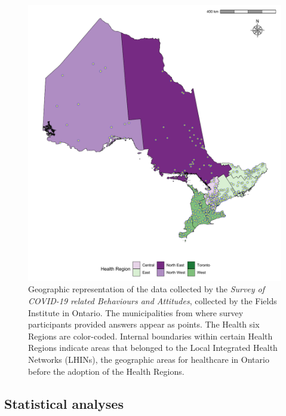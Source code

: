 \documentclass[
]{article}
\begin{document}
\begin{figure}

{\centering \includegraphics[width=\textwidth,height=1\textheight]{../data/map_data/map_cairo.pdf}

}

\caption{\label{fig-map}Geographic representation of the data collected
by the \emph{Survey of COVID-19 related Behaviours and Attitudes},
collected by the Fields Institute in Ontario. The municipalities from
where survey participants provided answers appear as points. The Health
six Regions are color-coded. Internal boundaries within certain Health
Regions indicate areas that belonged to the Local Integrated Health
Networks (LHINs), the geographic areas for healthcare in Ontario before
the adoption of the Health Regions.}

\end{figure}

\hypertarget{statistical-analyses}{%
\subsection{Statistical analyses}\label{statistical-analyses}}
\end{document}
